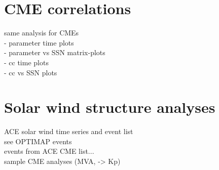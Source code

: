 \section{CME correlations}
same analysis for CMEs\\
- parameter time plots\\
- parameter vs SSN matrix-plots\\
- cc time plots\\
- cc vs SSN plots\\

\section{Solar wind structure analyses}
ACE solar wind time series and event list\\

see OPTIMAP events\\
events from ACE CME list...\\


sample CME analyses (MVA, -> Kp)\\
